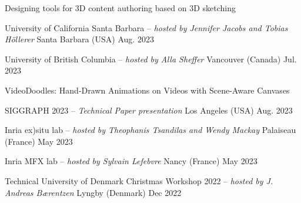 

\begin{cventries}

\cvtalkseries
    {Designing tools for 3D content authoring based on 3D sketching}
    {\begin{cvtalks}
        \item {\cvtalk
            {University of California Santa Barbara -- \textit{hosted by Jennifer Jacobs and Tobias Höllerer}}
            {Santa Barbara (USA)} %
            {Aug. 2023} %
            }
        \item {\cvtalk
            {University of British Columbia -- \textit{hosted by Alla Sheffer}}
            {Vancouver (Canada)} %
            {Jul. 2023} %
            }
    \end{cvtalks}}


\cvtalkseries
    {VideoDoodles: Hand-Drawn Animations on Videos with Scene-Aware Canvases}
    {\begin{cvtalks}
        \item {\cvtalk
            {SIGGRAPH 2023 -- \textit{Technical Paper presentation}}
            {Los Angeles (USA)} %
            {Aug. 2023} %
            }
        \item {\cvtalk
            {Inria ex)situ lab -- \textit{hosted by Theophanis Tsandilas and Wendy Mackay}}
            {Palaiseau (France)} %
            {May 2023} %
            }
        \item {\cvtalk
            {Inria MFX lab -- \textit{hosted by Sylvain Lefebvre}}
            {Nancy (France)} %
            {May 2023} %
            }
        \item {\cvtalk
            {Technical University of Denmark Christmas Workshop 2022  -- \textit{hosted by J. Andreas Bærentzen}}
            {Lyngby (Denmark)} %
            {Dec 2022} %
            }
    \end{cvtalks}}



\end{cventries}

